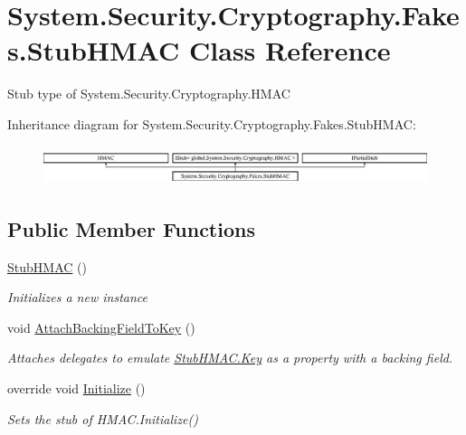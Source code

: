 \hypertarget{class_system_1_1_security_1_1_cryptography_1_1_fakes_1_1_stub_h_m_a_c}{\section{System.\-Security.\-Cryptography.\-Fakes.\-Stub\-H\-M\-A\-C Class Reference}
\label{class_system_1_1_security_1_1_cryptography_1_1_fakes_1_1_stub_h_m_a_c}
}


Stub type of System.\-Security.\-Cryptography.\-H\-M\-A\-C 


Inheritance diagram for System.\-Security.\-Cryptography.\-Fakes.\-Stub\-H\-M\-A\-C\-:\begin{figure}[H]
\begin{center}
\leavevmode
\includegraphics[height=1.148718cm]{class_system_1_1_security_1_1_cryptography_1_1_fakes_1_1_stub_h_m_a_c}
\end{center}
\end{figure}
\subsection*{Public Member Functions}
\begin{DoxyCompactItemize}
\item 
\hyperlink{class_system_1_1_security_1_1_cryptography_1_1_fakes_1_1_stub_h_m_a_c_afc1afb8c7c51c0309359fbc999c33aec}{Stub\-H\-M\-A\-C} ()
\begin{DoxyCompactList}\small\item\em Initializes a new instance\end{DoxyCompactList}\item 
void \hyperlink{class_system_1_1_security_1_1_cryptography_1_1_fakes_1_1_stub_h_m_a_c_aa8fa6964b5ddbfc7fbed90807b198545}{Attach\-Backing\-Field\-To\-Key} ()
\begin{DoxyCompactList}\small\item\em Attaches delegates to emulate \hyperlink{class_system_1_1_security_1_1_cryptography_1_1_fakes_1_1_stub_h_m_a_c_aae46dde375335196fe3304e592f01e88}{Stub\-H\-M\-A\-C.\-Key} as a property with a backing field.\end{DoxyCompactList}\item 
override void \hyperlink{class_system_1_1_security_1_1_cryptography_1_1_fakes_1_1_stub_h_m_a_c_aa81151cc1077d1a130af881a90fa78f3}{Initialize} ()
\begin{DoxyCompactList}\small\item\em Sets the stub of H\-M\-A\-C.\-Initialize()\end{DoxyCompactList}\end{DoxyCompactItemize}
